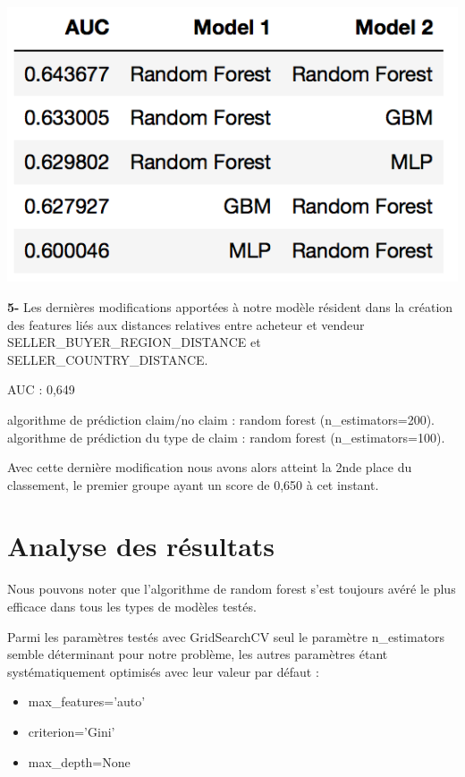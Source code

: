 \begin{center}
\includegraphics[scale=0.5]{assets/auc2} 
\end{center}

\textbf{5-} Les dernières modifications apportées à notre modèle résident dans la création
des features liés aux distances relatives entre acheteur et vendeur SELLER_BUYER_REGION_DISTANCE 
et SELLER_COUNTRY_DISTANCE. 

AUC : 0,649

algorithme de prédiction claim/no claim : random forest (n_estimators=200). \\
algorithme de prédiction du type de claim : random forest (n_estimators=100).

Avec cette dernière modification nous avons alors atteint la 2nde place du classement,
le premier groupe ayant un score de 0,650 à cet instant.

\section{Analyse des résultats}

Nous pouvons noter que l'algorithme de random forest s'est toujours avéré le plus efficace
dans tous les types de modèles testés.

Parmi les paramètres testés avec GridSearchCV seul le paramètre n_estimators semble 
déterminant pour notre problème, les autres paramètres étant systématiquement optimisés
avec leur valeur par défaut :

\begin{itemize}
\item max_features='auto'
\item criterion='Gini'
\item max_depth=None
\end{itemize}


